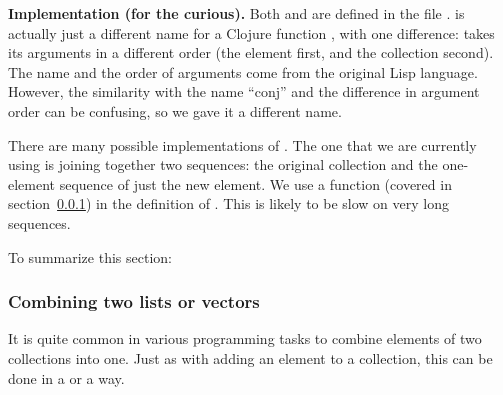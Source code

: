 {\bf Implementation (for the curious).} Both  and  are defined in the file .  is actually just a different name for a Clojure function , with one difference:  takes its arguments in a different order (the element first, and the collection second). The name  and the order of arguments come from the original Lisp language. However, the similarity with the name ``conj''  and the difference in argument order can be confusing, so we gave it a different name. 

There are many possible implementations of . The one that we are currently using is joining together two sequences: the original collection and the one-element sequence of just the new element. We use a function  (covered in section~\ref{subsubsec:into-concat}) in the definition of . This is likely to be slow on very long sequences.

To summarize this section:

\subsubsection{Combining two lists or vectors}\label{subsubsec:into-concat}
It is quite common in various programming tasks to combine elements of two collections into one. Just as with adding an element to a collection, this can be done in a  or a  way. 

